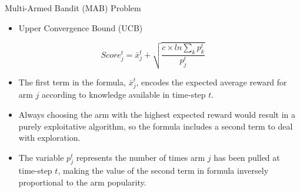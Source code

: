 \documentclass{beamer}
\begin{document}
\begin{frame}[t]{Multi-Armed Bandit (MAB) Problem} %
\begin{itemize}
\item Upper Convergence Bound (UCB)
\end{itemize}

\begin{equation}
Score_{j}^{t}=\bar{x}_{j}^{t}+\sqrt{\frac{c\times ln\sum_{k}p_{k}^{t}}{p_{j}^{t}}}
\end{equation}
\footnotesize
\begin{itemize}
\item  The first term in the formula, $\bar{x}_{j}^{t}$, encodes the expected average reward for arm $j$ according to knowledge available in time-step $t$.
\item Always choosing the arm with the highest expected reward would result in a purely exploitative algorithm, so the formula includes a second term to deal with exploration.
\item The variable $p_{j}^{t}$ represents the number of times arm $j$ has been pulled at time-step $t$, making the value of the second term in formula inversely proportional to the arm popularity.
\end{itemize}
\end{frame}
\end{document}
